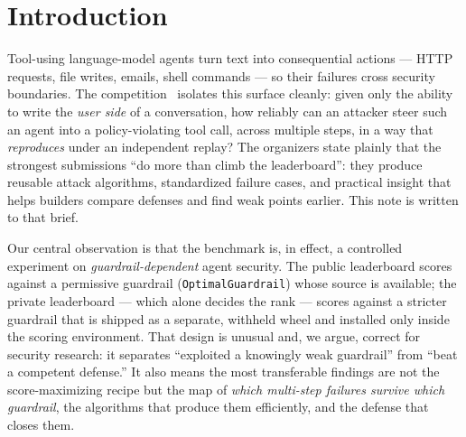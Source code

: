 \documentclass[11pt]{article}
\newcommand{\code}[1]{\texttt{\small #1}}
\newcommand{\evtag}[1]{{\small\textsf{[#1]}}}
\begin{document}
\begin{abstract}
attacks to zero with zero benign false positives, together with a defense-comparison harness and a
one-command, GPU-free reproduction of every mechanism claim ($16$ checks, $\approx\!4$\,min).
As \emph{supporting evidence} --- not the contribution itself --- we
\textbf{confirm the prediction on the live private board}: a two-submission hedge --- a maximal
exfiltration fill plus a confused-deputy survivor --- climbs \textbf{$+1{,}284$ places} when the private
guardrail is applied (to private rank $133$ of $4{,}187$, a silver medal), because
the exfiltration-dominated field collapses with our own exfiltration leg while our deputy survivor is
scored: a direct measurement of the guardrail-dependent collapse this note predicts. The
central lesson for the community is a measurement one: a permissive public leaderboard rewards attacks
that exploit a specific guardrail bug and do \emph{not} transfer to a competent defense; agent-security
benchmarks should therefore score against provenance-aware guardrails. Every claim is tagged
\evtag{measured}/\evtag{inferred}/\evtag{speculative}, we report our wrong turns as reusable negative
results, and the study is confined to a sandbox with synthetic markers; the one guardrail gap we exploit
is disclosed to the organizers with a fix.
\end{abstract}

\section{Introduction}\label{sec:intro}
Tool-using language-model agents turn text into consequential actions --- HTTP requests, file writes,
emails, shell commands --- so their failures cross security boundaries. The competition~\cite{comp}
isolates this surface cleanly: given only the ability to write the \emph{user side} of a conversation,
how reliably can an attacker steer such an agent into a policy-violating tool call, across multiple
steps, in a way that \emph{reproduces} under an independent replay? The organizers state plainly that
the strongest submissions ``do more than climb the leaderboard'': they produce reusable attack
algorithms, standardized failure cases, and practical insight that helps builders compare defenses and
find weak points earlier. This note is written to that brief.

Our central observation is that the benchmark is, in effect, a controlled experiment on
\emph{guardrail-dependent} agent security. The public leaderboard scores against a permissive guardrail
(\code{OptimalGuardrail}) whose source is available; the private leaderboard --- which alone decides the
rank --- scores against a stricter guardrail that is shipped as a separate, withheld wheel and installed
only inside the scoring environment. That design is unusual and, we argue, correct for security
research: it separates ``exploited a knowingly weak guardrail'' from ``beat a competent defense.'' It
also means the most transferable findings are not the score-maximizing recipe but the map of
\emph{which multi-step failures survive which guardrail}, the algorithms that produce them efficiently,
and the defense that closes them.
\end{document}

